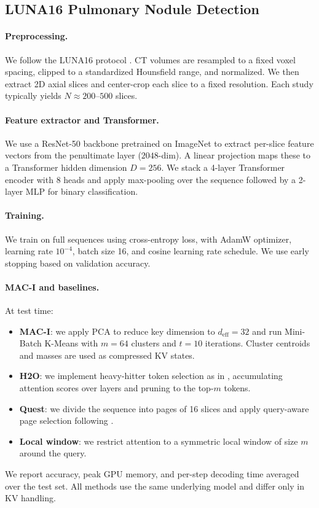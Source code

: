 \documentclass{article}
\theoremstyle{plain}
\theoremstyle{definition}
\theoremstyle{remark}
\begin{document}
\subsection{LUNA16 Pulmonary Nodule Detection}
\label{app:exp_luna_details}

\paragraph{Preprocessing.}
We follow the LUNA16 protocol \citep{setio2017validation}. CT volumes are resampled to a
fixed voxel spacing, clipped to a standardized Hounsfield range, and normalized. We then
extract 2D axial slices and center-crop each slice to a fixed resolution. Each study
typically yields $N\approx 200$--$500$ slices.

\paragraph{Feature extractor and Transformer.}
We use a ResNet-50 backbone pretrained on ImageNet to extract per-slice feature vectors
from the penultimate layer ($2048$-dim). A linear projection maps these to a Transformer
hidden dimension $D=256$. We stack a 4-layer Transformer encoder with 8 heads and apply
max-pooling over the sequence followed by a 2-layer MLP for binary classification.

\paragraph{Training.}
We train on full sequences using cross-entropy loss, with AdamW optimizer, learning rate
$10^{-4}$, batch size 16, and cosine learning rate schedule. We use early stopping based
on validation accuracy.

\paragraph{MAC-I and baselines.}
At test time:
\begin{itemize}[leftmargin=*,noitemsep,topsep=1pt]
    \item \textbf{MAC-I}: we apply PCA to reduce key dimension to $d_{\text{eff}}=32$
    and run Mini-Batch K-Means with $m=64$ clusters and $t=10$ iterations. Cluster
    centroids and masses are used as compressed KV states.
    \item \textbf{H2O}: we implement heavy-hitter token selection as in
    \citet{zhang2024h2o}, accumulating attention scores over layers and pruning to the
    top-$m$ tokens.
    \item \textbf{Quest}: we divide the sequence into pages of 16 slices and apply
    query-aware page selection following \citet{tang2024quest}.
    \item \textbf{Local window}: we restrict attention to a symmetric local window of
    size $m$ around the query.
\end{itemize}
We report accuracy, peak GPU memory, and per-step decoding time averaged over the test
set. All methods use the same underlying model and differ only in KV handling.
\end{document}
